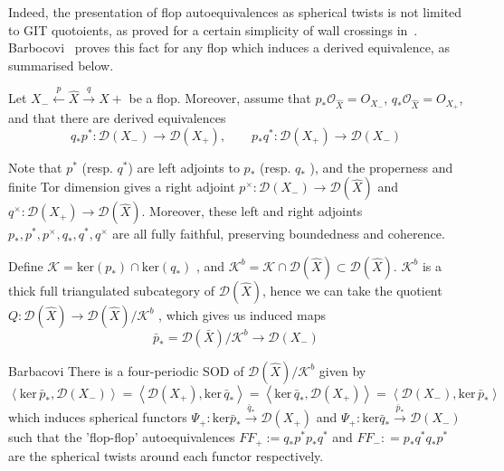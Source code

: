 Indeed, the presentation of flop autoequivalences as spherical twists is not limited to GIT quotoients, as proved for a certain simplicity of wall crossings in~\cite*{halpernleistner2016autoequivalences}. Barbocovi~\cite{barbacovi_spherical_2021} proves this fact for any flop which induces a derived equivalence, as summarised below.

Let $X_{-}\xleftarrow{p} \hat{X} \xrightarrow{q} X+$ be a flop. Moreover, assume that $p_{*}\mathcal{O}_{\hat{X}}= O_{X_-}$, $q_{*}\mathcal{O}_{\hat{X}}= O_{X_+}$,  and that there are derived equivalences$$
q_{*}p^{*}: \mathcal{D}(X_{-})\to \mathcal{D}(X_{+}), \qquad p_{*}q^{*}: \mathcal{D}(X_{+})\to \mathcal{D}(X_{-})
$$

Note that $p^*$ (resp. $q^{*}$) are left adjoints to $p_*$ (resp. $q_{*}$ ), and the properness and finite Tor dimension gives a right adjoint $p^{\times}: \mathcal{D}(X_{-})\to \mathcal{D}(\hat{X})$ and $q^{\times}: \mathcal{D}(X_{+})\to \mathcal{D}(\hat{X})$. Moreover, these left and right adjoints $p_{*}, p^{*} ,p^{\times}, q_{*}, q^{*},q^{\times}$ are all fully faithful, preserving boundedness and coherence.  

Define $\mathcal{K} = \mathrm{ker}(p_{*}) \cap \mathrm{ker}(q_{*})$ , and $\mathcal{ K}^{b}= \mathcal{K} \cap \mathcal{D}(\hat{X}) \subset \mathcal{D}(\hat{X})$. $\mathcal{K}^b$  is a thick full triangulated subcategory of $\mathcal{D}(\hat{X})$, hence we can take the quotient $Q: \mathcal{D}(\hat{X})\to \mathcal{D}(\hat{X})/\mathcal{K}^b$ , which gives us  induced maps
$$\bar{p}_{*} = \mathcal{D}(\bar{ X})/ \mathcal{K}^{b}\to \mathcal{D}(X_{-})$$

\begin{theorem}{Barbacovi}{}
There is a  four-periodic SOD of $\mathcal{D}(\hat{X})/\mathcal{K}^b$ given by $$
\left< \mathrm{ker}\,\bar{p}_{*},\mathcal{D}(X_{-}) \right> =  \left< \mathcal{D}(X_{+}), \mathrm{ker}\,\bar{q}_{*} \right> = \left< \mathrm{ker}\,\bar{q}_{*} , \mathcal{D}(X_{+})\right> = \left< \mathcal{D}(X_{-}), \mathrm{ker}\,\bar{p}_{*} \right>  
$$ which induces spherical functors $\Psi_{+}: \mathrm{ker} \bar{p}_{*}\xrightarrow{\bar{q}_{*}}\mathcal{D}(X_+)$ and $\Psi_{+}: \mathrm{ker} \bar{q}_{*}\xrightarrow{\bar{p}_{*}}\mathcal{D}(X_-)$ such that the 'flop-flop' autoequivalences $FF _{+}:= q_{*}p^{*}p_{*}q^{*}$ and $F F_{-}: = p_{*}q^{*}q_{*}p^*$ are the spherical twists around each functor respectively.
\end{theorem}

